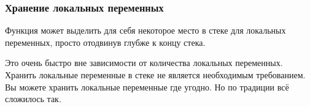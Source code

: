 \subsubsection{Хранение локальных переменных}

Функция может выделить для себя некоторое место в стеке для локальных переменных, просто отодвинув 
 глубже к концу стека.


Это очень быстро вне зависимости от количества локальных переменных.
Хранить локальные переменные в стеке не является необходимым требованием. 
Вы можете хранить локальные переменные где угодно. 
Но по традиции всё сложилось так.

